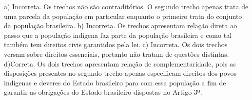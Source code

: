 \begin{enumerate}
a) Incorreta. Os trechos não são contraditórios. O segundo trecho
apenas trata de uma parcela da população em particular enquanto o
primeiro trata do conjunto da população brasileira.
b) Incorreta. Os trechos apresentam relação direta ao passo que a
população indígena faz parte da população brasileira e como tal também
tem direitos civis garantidos pela lei.
c) Incorreta. Os dois trechos versam sobre direitos essenciais, portanto
não tratam de questões distintas.
d)Correta. Os dois trechos apresentam relação de complementaridade, pois
as disposições presentes no segundo trecho apenas especificam direitos
dos povos indígenas e deveres do Estado brasileiro para com essa
população a fim de garantir as obrigações do Estado brasileiro dispostas
no Artigo 3º.

\end{enumerate}


